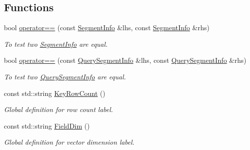 \subsection*{Functions}
\begin{DoxyCompactItemize}
\item 
\mbox{\label{namespacemilvus_abc4c6056766027cdd6939c1202b9f76e}} 
bool \hyperlink{namespacemilvus_abc4c6056766027cdd6939c1202b9f76e}{operator==} (const \hyperlink{classmilvus_1_1_segment_info}{Segment\+Info} \&lhs, const \hyperlink{classmilvus_1_1_segment_info}{Segment\+Info} \&rhs)
\begin{DoxyCompactList}\small\item\em To test two \hyperlink{classmilvus_1_1_segment_info}{Segment\+Info} are equal. \end{DoxyCompactList}\item 
\mbox{\label{namespacemilvus_a2203eefb89850518240702b86c79c1df}} 
bool \hyperlink{namespacemilvus_a2203eefb89850518240702b86c79c1df}{operator==} (const \hyperlink{classmilvus_1_1_query_segment_info}{Query\+Segment\+Info} \&lhs, const \hyperlink{classmilvus_1_1_query_segment_info}{Query\+Segment\+Info} \&rhs)
\begin{DoxyCompactList}\small\item\em To test two \hyperlink{classmilvus_1_1_query_segment_info}{Query\+Segment\+Info} are equal. \end{DoxyCompactList}\item 
\mbox{\label{namespacemilvus_a90e6cfd38449351dc8fbd719c71bff24}} 
const std\+::string \hyperlink{namespacemilvus_a90e6cfd38449351dc8fbd719c71bff24}{Key\+Row\+Count} ()
\begin{DoxyCompactList}\small\item\em Global definition for row count label. \end{DoxyCompactList}\item 
\mbox{\label{namespacemilvus_a2f4f7f32992a2db940dcc0eba6286d63}} 
const std\+::string \hyperlink{namespacemilvus_a2f4f7f32992a2db940dcc0eba6286d63}{Field\+Dim} ()
\begin{DoxyCompactList}\small\item\em Global definition for vector dimension label. \end{DoxyCompactList}\item 

\end{DoxyCompactItemize}
